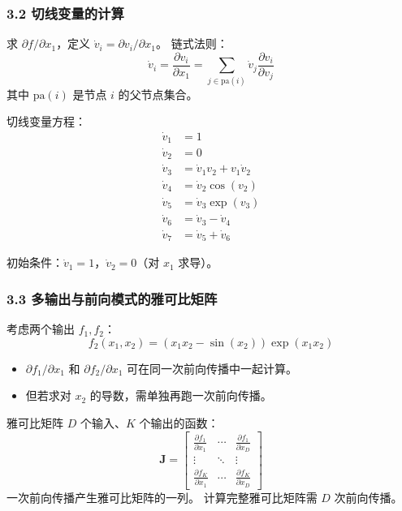 \documentclass[t,aspectratio=169]{beamer} %
\begin{document}
\begin{frame}[allowframebreaks]
    \frametitle{3.2 切线变量的计算}
    求 $\partial f / \partial x_1$，定义 $\dot{v}_i = \partial v_i / \partial x_1$。
    链式法则：
    \begin{equation}
        \dot{v}_i = \frac{\partial v_i}{\partial x_1} 
        = \sum_{j \in \mathrm{pa}(i)} \dot{v}_j \frac{\partial v_i}{\partial v_j}
        \tag{8.57}
    \end{equation}
    其中 $\mathrm{pa}(i)$ 是节点 $i$ 的\alert{父节点}集合。

    切线变量方程：
    \begin{align}
        \dot{v}_1 &= 1 \tag{8.58} \\
        \dot{v}_2 &= 0 \tag{8.59} \\
        \dot{v}_3 &= \dot{v}_1 v_2 + v_1 \dot{v}_2 \tag{8.60} \\
        \dot{v}_4 &= \dot{v}_2 \cos(v_2) \tag{8.61} \\
        \dot{v}_5 &= \dot{v}_3 \exp(v_3) \tag{8.62} \\
        \dot{v}_6 &= \dot{v}_3 - \dot{v}_4 \tag{8.63} \\
        \dot{v}_7 &= \dot{v}_5 + \dot{v}_6 \tag{8.64}
    \end{align}

    初始条件：$\dot{v}_1 = 1$，$\dot{v}_2 = 0$（对 $x_1$ 求导）。

\end{frame}

\begin{frame}
    \frametitle{3.3 多输出与前向模式的雅可比矩阵}
    考虑两个输出 $f_1, f_2$：
    \begin{equation}
        f_2(x_1, x_2) = (x_1 x_2 - \sin(x_2)) \exp(x_1 x_2)
        \tag{8.65}
    \end{equation}
    \begin{itemize}
        \item $\partial f_1 / \partial x_1$ 和 $\partial f_2 / \partial x_1$ 可在\alert{同一次前向传播}中一起计算。
        \item 但若求对 $x_2$ 的导数，需\alert{单独}再跑一次前向传播。
    \end{itemize}
    \begin{block}{雅可比矩阵}
        $D$ 个输入、$K$ 个输出的函数：
        \begin{equation}
            \mathbf{J} =
            \begin{bmatrix}
                \frac{\partial f_1}{\partial x_1} & \cdots & \frac{\partial f_1}{\partial x_D} \\
                \vdots & \ddots & \vdots \\
                \frac{\partial f_K}{\partial x_1} & \cdots & \frac{\partial f_K}{\partial x_D}
            \end{bmatrix}
            \tag{8.66}
        \end{equation}
        一次前向传播产生雅可比矩阵的\alert{一列}。
        计算完整雅可比矩阵需 $D$ 次前向传播。
    \end{block}
\end{frame}
\end{document}
